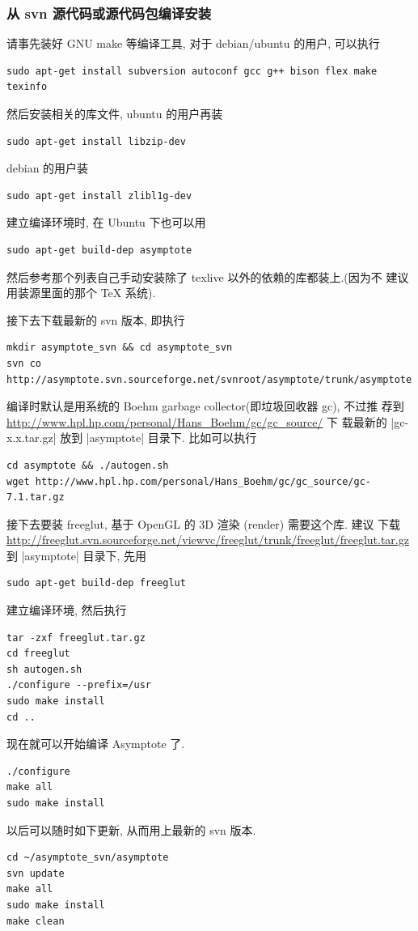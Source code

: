 \documentclass[nofonts,CJKnormalspaces]{ctexbook}[2009/05/20]
\begin{document}
\subsubsection{从 svn 源代码或源代码包编译安装}
请事先装好 GNU make 等编译工具, 对于 debian/ubuntu 的用户, 可以执行
\begin{verbatim}
sudo apt-get install subversion autoconf gcc g++ bison flex make texinfo
\end{verbatim}
然后安装相关的库文件, ubuntu 的用户再装
\begin{verbatim}
sudo apt-get install libzip-dev
\end{verbatim}
debian 的用户装
\begin{verbatim}
sudo apt-get install zlibl1g-dev
\end{verbatim}

建立编译环境时, 在 Ubuntu 下也可以用
\begin{verbatim}
sudo apt-get build-dep asymptote
\end{verbatim}
然后参考那个列表自己手动安装除了 texlive 以外的依赖的库都装上.(因为不
建议用装源里面的那个 TeX 系统).

接下去下载最新的 svn 版本, 即执行
\begin{verbatim}
mkdir asymptote_svn && cd asymptote_svn
svn co http://asymptote.svn.sourceforge.net/svnroot/asymptote/trunk/asymptote
\end{verbatim}
编译时默认是用系统的 Boehm garbage collector(即垃圾回收器 gc), 不过推
荐到 \url{http://www.hpl.hp.com/personal/Hans_Boehm/gc/gc_source/} 下
载最新的 |gc-x.x.tar.gz| 放到 |asymptote| 目录下.
比如可以执行
\begin{verbatim}
cd asymptote && ./autogen.sh
wget http://www.hpl.hp.com/personal/Hans_Boehm/gc/gc_source/gc-7.1.tar.gz
\end{verbatim}

接下去要装 freeglut, 基于 OpenGL 的 3D 渲染 (render) 需要这个库. 建议
下载
\url{http://freeglut.svn.sourceforge.net/viewvc/freeglut/trunk/freeglut/freeglut.tar.gz}
到 |asymptote| 目录下, 先用
\begin{verbatim}
sudo apt-get build-dep freeglut
\end{verbatim}
建立编译环境, 然后执行
\begin{verbatim}
tar -zxf freeglut.tar.gz
cd freeglut
sh autogen.sh
./configure --prefix=/usr
sudo make install
cd ..
\end{verbatim}

现在就可以开始编译 Asymptote 了.
\begin{verbatim}
./configure
make all
sudo make install
\end{verbatim}
以后可以随时如下更新, 从而用上最新的 svn 版本.
\begin{verbatim}
cd ~/asymptote_svn/asymptote
svn update
make all
sudo make install
make clean
\end{verbatim}
\end{document}
